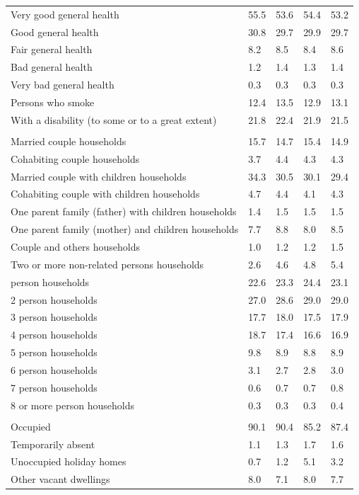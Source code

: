 \documentclass{article}
\begin{document}
\begin{table}[h]
\begin{tabular}{KTTTT}
    \hline
Very good general health & 55.5& 53.6&54.4& 53.2\\
Good general health & 30.8& 29.7& 29.9& 29.7\\
Fair general health & 8.2& 8.5&8.4& 8.6\\
Bad general health & 1.2& 1.4&1.3& 1.4\\
Very bad general health & 0.3& 0.3&0.3& 0.3\\
    \hline
Persons who smoke & 12.4& 13.5&12.9& 13.1\\
    \hline
With a disability (to some or to a great extent) & 21.8& 22.4&21.9& 21.5\\
\hline
    \\ 
    \hline
Married couple households & 15.7& 14.7& 15.4& 14.9\\
Cohabiting couple households & 3.7& 4.4& 4.3& 4.3\\
Married couple with children households & 34.3& 30.5& 30.1& 29.4\\
Cohabiting couple with children households & 4.7& 4.4& 4.1& 4.3\\
One parent family (father) with  children households & 1.4& 1.5& 1.5& 1.5\\
One parent family (mother) and children households & 7.7& 8.8& 8.0& 8.5\\
Couple and others households  & 1.0& 1.2& 1.2& 1.5\\
Two or more non-related persons households & 2.6& 4.6& 4.8& 5.4\\
     person households & 22.6& 23.3& 24.4& 23.1\\
2 person households & 27.0& 28.6& 29.0& 29.0\\
3 person households & 17.7& 18.0& 17.5& 17.9\\
4 person households & 18.7& 17.4& 16.6& 16.9\\
5 person households & 9.8& 8.9& 8.8& 8.9\\
6 person households & 3.1& 2.7& 2.8& 3.0\\
7 person households & 0.6& 0.7& 0.7& 0.8\\
8 or more person households & 0.3& 0.3& 0.3& 0.4\\
\hline
    \\ 
    \hline
Occupied & 90.1& 90.4& 85.2& 87.4\\
Temporarily absent & 1.1& 1.3& 1.7& 1.6\\
Unoccupied holiday homes & 0.7& 1.2& 5.1& 3.2\\
Other vacant dwellings & 8.0& 7.1& 8.0& 7.7\\
\hline
\end{tabular}
\end{table}
\end{document}
